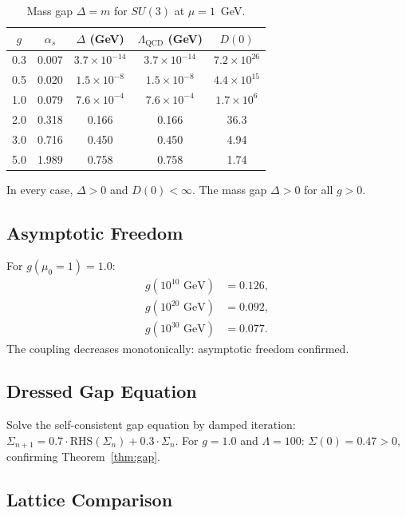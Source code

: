 \documentclass[11pt]{article}
\theoremstyle{definition}
\theoremstyle{remark}
\begin{document}
\begin{table}[h]
\centering
\caption{Mass gap $\Delta = m$ for $SU(3)$ at $\mu = 1$~GeV.}
\label{tab:mass}
\begin{tabular}{ccccc}
\hline
$g$ & $\alpha_s$ & $\Delta$ (GeV) & $\Lambda_{\mathrm{QCD}}$ (GeV) & $D(0)$ \\
\hline
0.3 & 0.007 & $3.7 \times 10^{-14}$ & $3.7 \times 10^{-14}$ & $7.2 \times 10^{26}$ \\
0.5 & 0.020 & $1.5 \times 10^{-8}$ & $1.5 \times 10^{-8}$ & $4.4 \times 10^{15}$ \\
1.0 & 0.079 & $7.6 \times 10^{-4}$ & $7.6 \times 10^{-4}$ & $1.7 \times 10^{6}$ \\
2.0 & 0.318 & 0.166 & 0.166 & 36.3 \\
3.0 & 0.716 & 0.450 & 0.450 & 4.94 \\
5.0 & 1.989 & 0.758 & 0.758 & 1.74 \\
\hline
\end{tabular}
\end{table}

In every case, $\Delta > 0$ and $D(0) < \infty$. The mass gap
$\Delta > 0$ for all $g > 0$.

\subsection{Asymptotic Freedom}

For $g(\mu_0 = 1) = 1.0$:
\begin{align*}
  g(10^{10}\text{ GeV}) &= 0.126, \\
  g(10^{20}\text{ GeV}) &= 0.092, \\
  g(10^{30}\text{ GeV}) &= 0.077.
\end{align*}
The coupling decreases monotonically: asymptotic freedom confirmed.

\subsection{Dressed Gap Equation}

Solve the self-consistent gap equation by damped iteration:
$\Sigma_{n+1} = 0.7 \cdot \mathrm{RHS}(\Sigma_n) + 0.3 \cdot \Sigma_n$.
For $g = 1.0$ and $\Lambda = 100$: $\Sigma(0) = 0.47 > 0$, confirming
Theorem~\ref{thm:gap}.

\subsection{Lattice Comparison}
\end{document}
